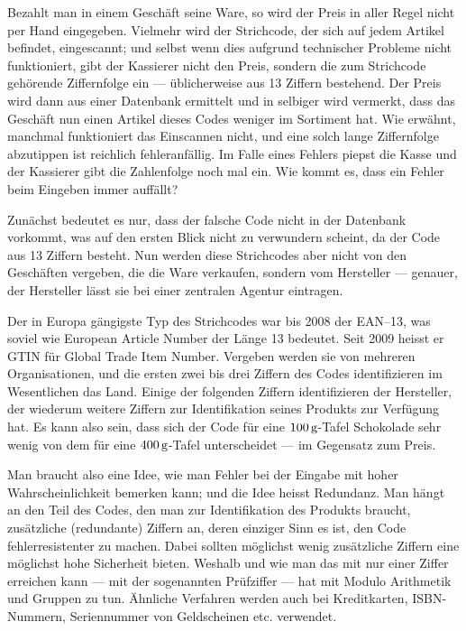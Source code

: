 \documentclass[%
11pt,%
twoside,%
titlepage,%
german,%
headsepline%
]{scrartcl}
\begin{document}
Bezahlt man in einem Geschäft seine Ware, so wird der Preis in aller Regel nicht per Hand eingegeben. Vielmehr wird der Strichcode, der sich auf jedem Artikel befindet, eingescannt; und selbst wenn dies aufgrund technischer Probleme nicht funktioniert, gibt der Kassierer nicht den Preis, sondern die zum Strichcode gehörende Ziffernfolge ein --- üblicherweise aus 13 Ziffern bestehend. Der Preis wird dann aus einer Datenbank ermittelt und in selbiger wird vermerkt, dass das Geschäft nun einen Artikel dieses Codes weniger im Sortiment hat. Wie erwähnt, manchmal funktioniert das Einscannen nicht, und eine solch lange Ziffernfolge abzutippen ist reichlich fehleranfällig. Im Falle eines Fehlers piepst die Kasse und der Kassierer gibt die Zahlenfolge noch mal ein. Wie kommt es, dass ein Fehler beim Eingeben immer auffällt?

Zunächst bedeutet es nur, dass der falsche Code nicht in der Datenbank vorkommt, was auf den ersten Blick nicht zu verwundern scheint, da der Code aus 13 Ziffern besteht. Nun werden diese Strichcodes aber nicht von den Geschäften vergeben, die die Ware verkaufen, sondern vom Hersteller --- genauer, der Hersteller lässt sie bei einer zentralen Agentur eintragen.

Der in Europa gängigste Typ des Strichcodes war bis 2008 der EAN--13, was soviel wie European Article Number der Länge 13 bedeutet. Seit 2009 heisst er GTIN für Global Trade Item Number. Vergeben werden sie von mehreren Organisationen, und die ersten zwei bis drei Ziffern des Codes identifizieren im Wesentlichen das Land. Einige der folgenden Ziffern identifizieren der Hersteller, der wiederum weitere Ziffern zur Identifikation seines Produkts zur Verfügung hat. Es kann also sein, dass sich der Code für eine $\unit[100]{g}$-Tafel Schokolade sehr wenig von dem für eine $\unit[400]{g}$-Tafel unterscheidet --- im Gegensatz zum Preis.

Man braucht also eine Idee, wie man Fehler bei der Eingabe mit hoher Wahrscheinlichkeit bemerken kann; und die Idee heisst Redundanz. Man hängt an den Teil des Codes, den man zur Identifikation des Produkts braucht, zusätzliche (redundante) Ziffern an, deren einziger Sinn es ist, den Code fehlerresistenter zu machen. Dabei sollten möglichst wenig zusätzliche Ziffern eine möglichst hohe Sicherheit bieten. Weshalb und wie man das mit nur einer Ziffer erreichen kann --- mit der sogenannten Prüfziffer --- hat mit Modulo Arithmetik und Gruppen zu tun. Ähnliche Verfahren werden auch bei Kreditkarten, ISBN-Nummern, Seriennummer von Geldscheinen etc. verwendet.
\end{document}
